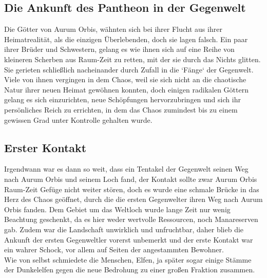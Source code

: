 \documentclass[a4paper,12pt,oneside]{book}
\begin{document}
\subsection{Die Ankunft des Pantheon in der Gegenwelt}
Die Götter von Aurum Orbis, wähnten sich bei ihrer Flucht aus ihrer Heimatrealität, als die einzigen Überlebenden, doch sie lagen falsch. Ein paar ihrer Brüder und Schwestern, gelang es wie ihnen sich auf eine Reihe von kleineren Scherben aus Raum-Zeit zu retten, mit der sie durch das Nichts glitten. Sie gerieten schließlich nacheinander durch Zufall in die `Fänge` der Gegenwelt. Viele von ihnen vergingen in dem Chaos, weil sie sich nicht an die chaotische Natur ihrer neuen Heimat gewöhnen konnten, doch einigen radikalen Göttern gelang es sich einzurichten, neue Schöpfungen hervorzubringen und sich ihr persönliches Reich zu errichten, in dem das Chaos zumindest bis zu einem gewissen Grad unter Kontrolle gehalten wurde.

\subsection{Erster Kontakt}
Irgendwann war es dann so weit, dass ein Tentakel der Gegenwelt seinen Weg nach Aurum Orbis und seinem Loch fand, der Kontakt sollte zwar Aurum Orbis Raum-Zeit Gefüge nicht weiter stören, doch es wurde eine schmale Brücke in das Herz des Chaos geöffnet, durch die die ersten Gegenwelter ihren Weg nach Aurum Orbis fanden.
Dem Gebiet um das Weltloch wurde lange Zeit nur wenig Beachtung geschenkt, da es hier weder wertvolle Ressourcen, noch Manareserven gab. Zudem war die Landschaft unwirklich und unfruchtbar, daher blieb die Ankunft der ersten Gegenweltler vorerst unbemerkt und der erste Kontakt war ein wahrer Schock, vor allem auf Seiten der angestammten Bewohner. 
\\Wie von selbst schmiedete die Menschen, Elfen, ja später sogar einige Stämme der Dunkelelfen gegen die neue Bedrohung zu einer großen Fraktion zusammen.
\end{document}
